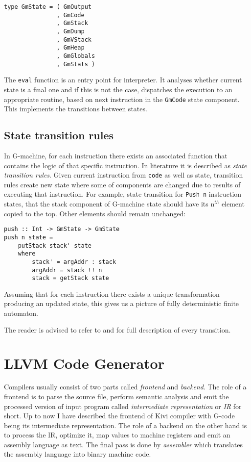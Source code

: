 \documentclass[12pt,a4paper]{report}
\begin{document}
\hspace*{-1.5in}
\begin{lstlisting}[style=haskell]
type GmState = ( GmOutput
               , GmCode
               , GmStack
               , GmDump
               , GmVStack
               , GmHeap
               , GmGlobals
               , GmStats )
\end{lstlisting}

The \texttt{eval} function is an entry point for interpreter. It analyses
whether current state is a final one and if this is not the case, dispatches
the execution to an appropriate routine, based on next instruction in the
\texttt{GmCode} state component. This implements the transitions between states.

\subsection{State transition rules}
In G-machine, for each instruction there exists an associated function that
contains the logic of that specific instruction. In literature it is described
as \textit{state transition rules}. Given current instruction from
\texttt{code} as well as state, transition rules create new state where some of
components are changed due to results of executing that instruction. For
example, state transition for \texttt{Push n} instruction states, that the
stack component of G-machine state should have its n$^{th}$ element copied to
the top. Other elements should remain unchanged:

\hspace*{-1.5in}
\begin{lstlisting}[style=haskell]
push :: Int -> GmState -> GmState
push n state =
    putStack stack' state
    where
        stack' = argAddr : stack
        argAddr = stack !! n
        stack = getStack state
\end{lstlisting}

Assuming that for each
instruction there exists a unique transformation producing an updated state,
this gives us a picture of fully deterministic finite automaton.

The reader is advised to refer to \cite{Jon87} and \cite{JonLes00} for full
description of every transition.

\section{LLVM Code Generator}
\label{sec:llvm_codegen}
Compilers usually consist of two parts called \textit{frontend} and
\textit{backend}. The role of a frontend is to parse the source file, perform
semantic analysis and emit the processed version of input program called
\textit{intermediate representation} or \textit{IR} for short. Up to now I have
described the frontend of Kivi compiler with G-code being its intermediate
representation. The role of a backend on the other hand is to process the IR,
optimize it, map values to machine registers and emit an assembly language as
text. The final pass is done by \textit{assembler} which translates the
assembly language into binary machine code.
\end{document}
